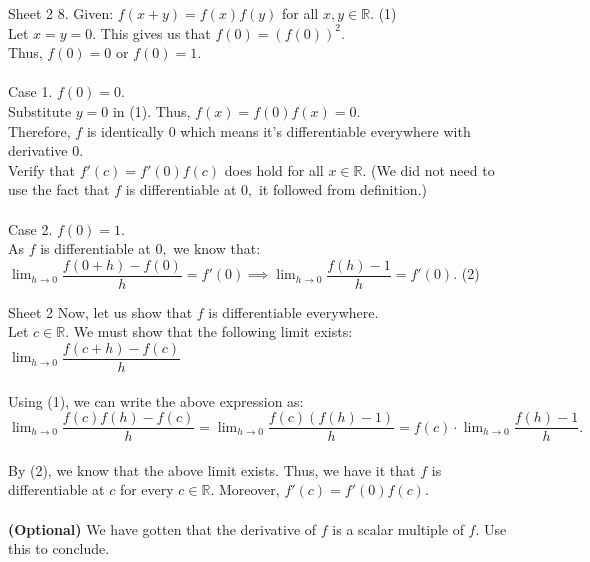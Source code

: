 \documentclass[handout, aspectratio=169]{beamer}
\begin{document}
\begin{frame}{Sheet 2}
	8. Given: $f(x + y) = f(x)f(y)$ for all $x, y \in \mathbb{R}.$ \hfill (1)\\
	Let $x = y = 0.$ This gives us that $f(0) = \left(f(0)\right)^2.$\\
	Thus, $f(0) = 0$ or $f(0) = 1.$\\~\\
	Case 1. $f(0) = 0.$\\
	Substitute $y = 0$ in (1). Thus, $f(x) = f(0)f(x) = 0.$\\
	Therefore, $f$ is identically $0$ which means it's differentiable everywhere with derivative $0.$ \\
	Verify that $f'(c) = f'(0)f(c)$ does hold for all $x \in \mathbb{R}.$ (We did not need to use the fact that $f$ is differentiable at $0,$ it followed from definition.)\\~\\
	Case 2. $f(0) = 1.$\\
	As $f$ is differentiable at $0,$ we know that:\\
	$\displaystyle\lim_{h\to 0}\dfrac{f(0+h) - f(0)}{h} = f'(0) \implies \displaystyle\lim_{h\to 0}\dfrac{f(h) - 1}{h} = f'(0).$ \hfill (2)\\
\end{frame}
\begin{frame}{Sheet 2}
	Now, let us show that $f$ is differentiable everywhere.\\
	Let $c \in \mathbb{R}.$ We must show that the following limit exists:\\
	$\displaystyle\lim_{h\to 0}\dfrac{f(c + h) - f(c)}{h}$\\~\\
	Using (1), we can write the above expression as:\\
	$\displaystyle\lim_{h\to 0}\dfrac{f(c)f(h) - f(c)}{h} = \lim_{h\to 0}\dfrac{f(c)(f(h) - 1)}{h} = f(c)\cdot\lim_{h\to 0}\dfrac{f(h) - 1}{h}.$\\~\\
	By (2), we know that the above limit exists. Thus, we have it that $f$ is differentiable at $c$ for every $c \in \mathbb{R}.$ Moreover, $f'(c) = f'(0)f(c).$\\~\\
	\textbf{(Optional)} We have gotten that the derivative of $f$ is a scalar multiple of $f.$ Use this to conclude.	
\end{frame}
\end{document}
